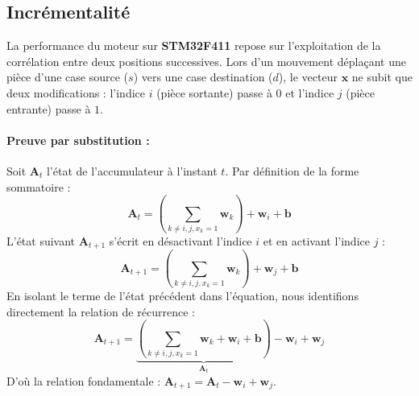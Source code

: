 \documentclass[11pt, a4paper]{article}
\begin{document}
\subsection{Incrémentalité}
La performance du moteur sur \textbf{STM32F411} repose sur l'exploitation de la corrélation entre deux positions successives. Lors d'un mouvement déplaçant une pièce d'une case source ($s$) vers une case destination ($d$), le vecteur $\mathbf{x}$ ne subit que deux modifications : l'indice $i$ (pièce sortante) passe à $0$ et l'indice $j$ (pièce entrante) passe à $1$.

\paragraph{Preuve par substitution :}
Soit $\mathbf{A}_t$ l'état de l'accumulateur à l'instant $t$. Par définition de la forme sommatoire :
\begin{equation}
    \mathbf{A}_t = \left( \sum_{k \neq i, j, x_k=1} \mathbf{w}_k \right) + \mathbf{w}_i + \mathbf{b}
\end{equation}
L'état suivant $\mathbf{A}_{t+1}$ s'écrit en désactivant l'indice $i$ et en activant l'indice $j$ :
\begin{equation}
    \mathbf{A}_{t+1} = \left( \sum_{k \neq i, j, x_k=1} \mathbf{w}_k \right) + \mathbf{w}_j + \mathbf{b}
\end{equation}
En isolant le terme de l'état précédent dans l'équation, nous identifions directement la relation de récurrence :
\begin{equation}
    \mathbf{A}_{t+1} = \underbrace{\left( \sum_{k \neq i, j, x_k=1} \mathbf{w}_k + \mathbf{w}_i + \mathbf{b} \right)}_{\mathbf{A}_t} - \mathbf{w}_i + \mathbf{w}_j
\end{equation}
D'où la relation fondamentale : $\mathbf{A}_{t+1} = \mathbf{A}_t - \mathbf{w}_i + \mathbf{w}_j$.
\end{document}
